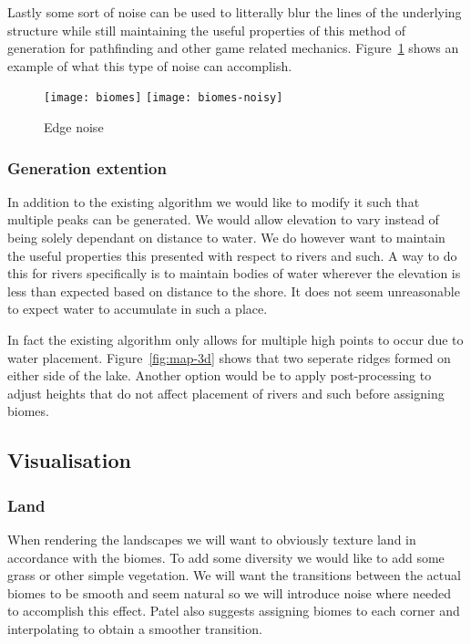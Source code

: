 Lastly some sort of noise can be used to litterally blur the lines of the underlying structure while still maintaining the useful properties of this method of generation for pathfinding and other game related mechanics. Figure~\ref{fig:biomes} shows an example of what this type of noise can accomplish.

\newlength{\imagewidth}

\begin{figure}[h]
	\centering
	\texttt{[image: biomes]}
	\texttt{[image: biomes-noisy]}
	\caption{Edge noise}
	\label{fig:biomes}
\end{figure}

\subsubsection{Generation extention}

In addition to the existing algorithm we would like to modify it such that multiple peaks can be generated. We would allow elevation to vary instead of being solely dependant on distance to water. We do however want to maintain the useful properties this presented with respect to rivers and such. A way to do this for rivers specifically is to maintain bodies of water wherever the elevation is less than expected based on distance to the shore. It does not seem unreasonable to expect water to accumulate in such a place. 

In fact the existing algorithm only allows for multiple high points to occur due to water placement. Figure~\ref{fig:map-3d} shows that two seperate ridges formed on either side of the lake. Another option would be to apply post-processing to adjust heights that do not affect placement of rivers and such before assigning biomes.

\subsection{Visualisation}

\subsubsection{Land}

When rendering the landscapes we will want to obviously texture land in accordance with the biomes. To add some diversity we would like to add some grass or other simple vegetation. We will want the transitions between the actual biomes to be smooth and seem natural so we will introduce noise where needed to accomplish this effect. Patel\cite{redblob} also suggests assigning biomes to each corner and interpolating to obtain a smoother transition.


